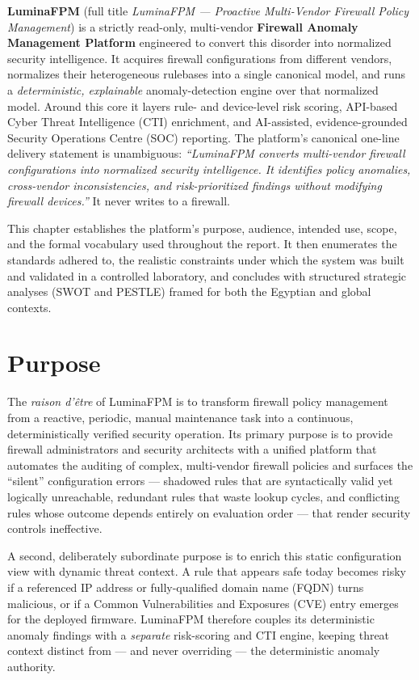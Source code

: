 \documentclass[12pt,a4paper]{report}
\renewcommand{\_}{\textunderscore\allowbreak}
\begin{document}
\textbf{LuminaFPM} (full title \emph{LuminaFPM --- Proactive Multi-Vendor Firewall Policy Management}) is a strictly read-only, multi-vendor \textbf{Firewall Anomaly Management Platform} engineered to convert this disorder into normalized security intelligence. It acquires firewall configurations from different vendors, normalizes their heterogeneous rulebases into a single canonical model, and runs a \emph{deterministic, explainable} anomaly-detection engine over that normalized model. Around this core it layers rule- and device-level risk scoring, API-based Cyber Threat Intelligence (CTI) enrichment, and AI-assisted, evidence-grounded Security Operations Centre (SOC) reporting. The platform's canonical one-line delivery statement is unambiguous: \emph{``LuminaFPM converts multi-vendor firewall configurations into normalized security intelligence. It identifies policy anomalies, cross-vendor inconsistencies, and risk-prioritized findings without modifying firewall devices.''} It never writes to a firewall.

This chapter establishes the platform's purpose, audience, intended use, scope, and the formal vocabulary used throughout the report. It then enumerates the standards adhered to, the realistic constraints under which the system was built and validated in a controlled laboratory, and concludes with structured strategic analyses (SWOT and PESTLE) framed for both the Egyptian and global contexts.

\section{Purpose}
\label{sec:ch1-purpose}

The \emph{raison d'\^etre} of LuminaFPM is to transform firewall policy management from a reactive, periodic, manual maintenance task into a continuous, deterministically verified security operation. Its primary purpose is to provide firewall administrators and security architects with a unified platform that automates the auditing of complex, multi-vendor firewall policies and surfaces the ``silent'' configuration errors --- shadowed rules that are syntactically valid yet logically unreachable, redundant rules that waste lookup cycles, and conflicting rules whose outcome depends entirely on evaluation order --- that render security controls ineffective.

A second, deliberately subordinate purpose is to enrich this static configuration view with dynamic threat context. A rule that appears safe today becomes risky if a referenced IP address or fully-qualified domain name (FQDN) turns malicious, or if a Common Vulnerabilities and Exposures (CVE) entry emerges for the deployed firmware. LuminaFPM therefore couples its deterministic anomaly findings with a \emph{separate} risk-scoring and CTI engine, keeping threat context distinct from --- and never overriding --- the deterministic anomaly authority.
\end{document}
